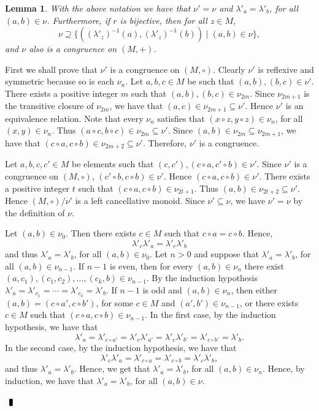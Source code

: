 \documentclass[10pt]{article}
\newtheorem{lemma}[theorem]{Lemma}
\newenvironment{proof}{\par\noindent{\bf Proof.}}{$\qed$\par\bigskip}
\newcommand{\qed}{\enspace\vrule  height6pt  width4pt  depth2pt}
\begin{document}
\begin{lemma}\label{lemma1}
	With the above notation we have that $\nu'=\nu$ and
	$\lambda'_a=\lambda'_b$, for all $(a,b)\in \nu$. Furthermore, if $r$ is bijective, then for
	all $z\in M$,
	$$\nu\supseteq \{ ( (\lambda'_z)^{-1}(a),(\lambda'_z)^{-1}(b))\mid (a,b)\in\nu\},$$
	and $\nu$ also is a congruence on $(M,+)$.
\end{lemma}
\begin{proof}
	First we shall prove that $\nu'$ is a congruence on $(M,\circ)$.
	Clearly $\nu'$ is reflexive and symmetric because so is each
	$\nu_n$. Let $a,b,c\in M$ be such that $(a,b),(b,c)\in \nu'$. There
	exists a positive integer $m$ such that $(a,b),(b,c)\in
	\nu_{2m}$. Since $\nu_{2m+1}$ is the transitive closure of
	$\nu_{2m}$, we have that $(a,c)\in \nu_{2m+1}\subseteq \nu'$.
	Hence $\nu'$ is an equivalence relation. Note that every $\nu_n$
	satisfies that $(x\circ z,y\circ z)\in\nu_n$,  for all $(x,y)\in \nu_n$.
	Thus $(a\circ c,b\circ c)\in \nu_{2m}\subseteq \nu'$. Since $(a,b)\in
	\nu_{2m}\subseteq\nu_{2m+1}$, we have that $(c\circ a,c\circ b)\in \nu_{2m+2}\subseteq
	\nu'$. Therefore, $\nu'$ is a congruence.
	
	Let $a,b,c,c'\in M$ be elements such that $(c,c'),(c\circ a,c'\circ b)\in \nu'$. Since $\nu'$ is a congruence on $(M,\circ)$, $(c'\circ b,c\circ b)\in \nu'$. Hence $(c\circ a,c\circ b)\in\nu'$. There exists a positive integer $t$ such that $(c\circ a,c\circ b)\in\nu_{2t+1}.$
	Thus $(a,b)\in \nu_{2t+2}\subseteq \nu'$. Hence $(M,\circ)/\nu'$ is a
	left cancellative monoid. Since $\nu'\subseteq \nu$, we have
	$\nu'=\nu$ by the definition of $\nu$.
	
	Let $(a,b)\in \nu_0$. Then there exists $c\in M$ such that
	$c\circ a=c\circ b$. Hence,
	$$\lambda'_{c}\lambda'_{a}=\lambda'_{c}\lambda'_{b}$$
	and thus $\lambda'_a=\lambda'_b$, for all $(a,b)\in
	\nu_0$. Let $n>0$ and suppose that $\lambda'_a=\lambda'_b$, for all $(a,b)\in
	\nu_{n-1}$. If $n-1$ is even, then for every $(a,b)\in \nu_n$ there exist $(a,c_1), (c_1,c_2),\dots, (c_k,b)\in \nu_{n-1}$. By the induction hypothesis $\lambda'_a=\lambda'_{c_1}=\cdots =\lambda'_{c_k}=\lambda'_b$. If $n-1$ is odd and $(a,b)\in \nu_n$, then either $(a,b)=(c\circ a',c\circ b')$, for some $c\in M$ and $(a',b')\in \nu_{n-1}$, or there exists $c\in M$ such that $(c\circ a,c\circ b)\in\nu_{n-1}$. In the first case, by the induction hypothesis, we have that
	$$\lambda'_a=\lambda'_{c\circ a'}=\lambda'_c\lambda'_{a'}=\lambda'_c\lambda'_{b'}=\lambda'_{c\circ b'}=\lambda'_b.$$
	In the second case, by the induction hypothesis, we have that  
	$$\lambda'_c\lambda'_{a}=\lambda'_{c\circ a}=\lambda'_{c\circ b}=\lambda'_c\lambda'_{b},$$
	and thus $\lambda'_a=\lambda'_b$. Hence, we get that $\lambda'_a=\lambda'_b$, for all $(a,b)\in \nu_n$. Hence, by induction, we have that
	$\lambda'_a=\lambda'_b$, for all $(a,b)\in \nu$.
	

\end{proof}
\end{document}
